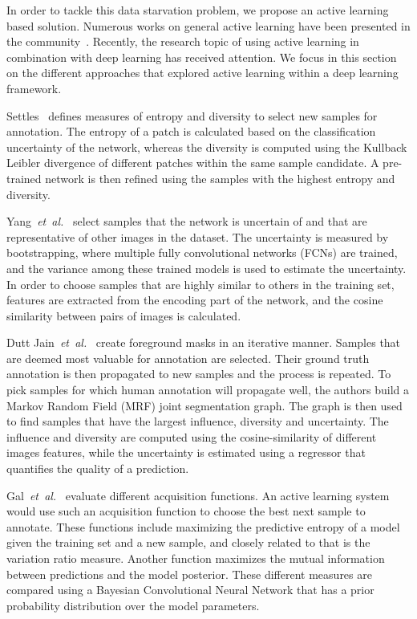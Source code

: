 \documentclass[letterpaper, 10 pt, conference]{ieeeconf}  %
\newcommand\etal{\emph{et~al.}}
\begin{document}
In order to tackle this data starvation problem, we propose an active learning based solution. Numerous works on general active learning have been presented in the community~\cite{settles2009active,guyon2011results,holub2008entropy}. Recently, the research topic of using active learning in combination with deep learning has received attention. We focus in this section on the different approaches that explored active learning within a deep learning framework.

Settles~\cite{zhou2017fine} defines measures of entropy and diversity to select new samples for annotation. The entropy of a patch is calculated based on the classification uncertainty of the network, whereas the diversity is computed using the Kullback Leibler divergence of different patches within the same sample candidate. A pre-trained network is then refined using the samples with the highest entropy and diversity.

Yang~\etal~\cite{yang2017suggestive} select samples that the network is uncertain of and that are representative of other images in the dataset. The uncertainty is measured by bootstrapping, where multiple fully convolutional networks (FCNs) are trained, and the variance among  these trained models is used to estimate the uncertainty. In order to choose samples that are highly similar to others in the training set, features are extracted from the encoding part of the network, and the cosine similarity between pairs of images is calculated. 

Dutt Jain~\etal~\cite{dutt2016active} create foreground masks in an iterative manner. Samples that are deemed most valuable for annotation are selected. Their ground truth annotation is then propagated to new samples and the process is repeated. To pick samples for which human annotation will propagate well, the authors build a Markov Random Field (MRF) joint segmentation graph. The graph is then used to find samples that have the largest influence, diversity and uncertainty. The influence and diversity are computed using the cosine-similarity of different images features, while the uncertainty is estimated using a regressor that quantifies the quality of a prediction. 

Gal~\etal~\cite{gal2017deep} evaluate different acquisition functions. An active learning system would use such an acquisition function to choose the best next sample to annotate. These functions include maximizing the predictive entropy of a model given the training set and a new sample, and closely related to that is the variation ratio measure. Another function maximizes the mutual information between predictions and the model posterior. These different measures are compared using a Bayesian Convolutional Neural Network that has a prior probability distribution over the model parameters.  
\end{document}
